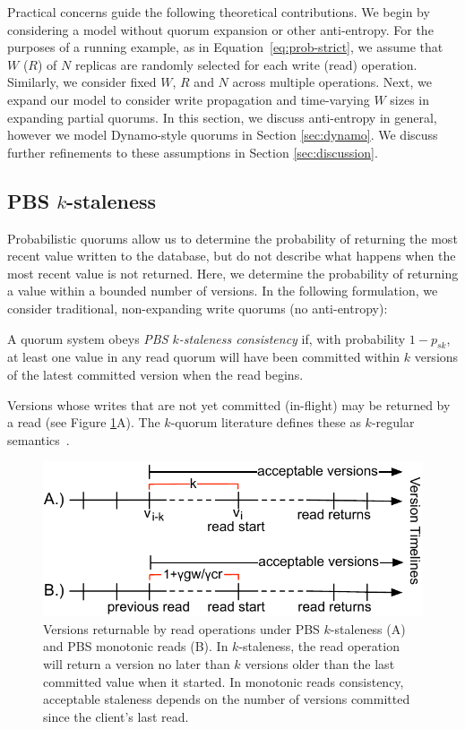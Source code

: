 \documentclass{vldb}
\newcommand{\subsectionskip}{-0em}
\begin{document}
Practical concerns guide the following theoretical contributions.  We
begin by considering a model without quorum expansion or other
anti-entropy.  For the purposes of a running example, as in
Equation~\ref{eq:prob-strict}, we assume that $W$ ($R$) of $N$
replicas are randomly selected for each write (read) operation.
Similarly, we consider fixed $W$, $R$ and $N$ across multiple
operations. Next, we expand our model to consider write propagation
and time-varying $W$ sizes in expanding partial quorums.  In this
section, we discuss anti-entropy in general, however we model
Dynamo-style quorums in Section \ref{sec:dynamo}. We discuss further
refinements to these assumptions in Section \ref{sec:discussion}.

\vspace{\subsectionskip}\subsection{PBS $k$-staleness}
\label{sec:kstale}

Probabilistic quorums allow us to determine the probability of
returning the most recent value written to the database, but do not
describe what happens when the most recent value is not returned.
Here, we determine the probability of returning a value within a
bounded number of versions.  In the following formulation, we consider
traditional, non-expanding write quorums (no anti-entropy):
\begin{definition}
A quorum system obeys \textit{PBS $k$-staleness consistency} if, with
probability $1-p_{sk}$, at least one value in any read quorum will
have been committed within $k$ versions of the latest committed
version when the read begins.
\end{definition}
Versions whose writes that are not yet committed (in-flight) may be
returned by a read (see Figure \ref{fig:timelines}A).  The $k$-quorum
literature defines these as $k$-regular semantics~\cite{non-strict}.

\begin{figure}
\centering
\includegraphics[width=.95\columnwidth]{figs/timelines.pdf}
\vspace{-8pt}
\caption{Versions returnable by read operations under PBS
  $k$-staleness (A) and PBS monotonic reads (B). In $k$-staleness, the
  read operation will return a version no later than $k$ versions
  older than the last committed value when it started.  In monotonic
  reads consistency, acceptable staleness depends on the number of
  versions committed since the client's last read.}
\vspace{-12pt}
\label{fig:timelines}
\end{figure}
\end{document}
